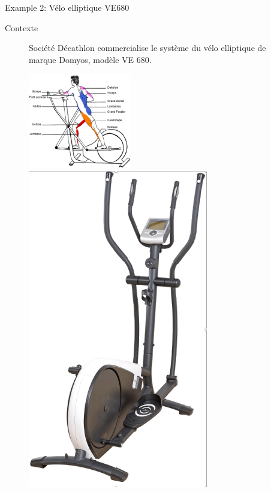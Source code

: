 \documentclass[
  ignorenonframetext,
  aspectratio=169,
  c]{beamer}
\begin{document}
\begin{frame}{Example 2: Vélo elliptique VE680}
\begin{block}{Contexte}
\begin{figure}

\begin{minipage}{0.80\linewidth}
Société Décathlon commercialise le système du vélo elliptique de marque
Domyos, modèle VE 680.\begin{center}
\includegraphics[width=0.4\textwidth,height=\textheight]{CM3/Velo-fonctionnelle.png}
\end{center}
\end{minipage}%
%
\begin{minipage}{0.20\linewidth}
\begin{center}
\includegraphics[width=0.7\textwidth,height=\textheight]{CM3/Velo.png}
\end{center}
\end{minipage}%


\end{figure}
\end{block}
\end{frame}
\end{document}
